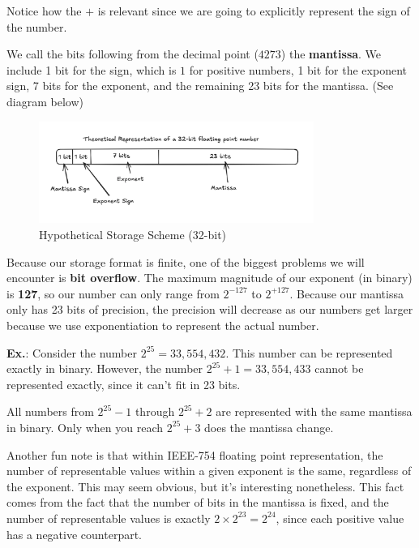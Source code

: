 \documentclass[12pt]{article}
\newcommand{\Ex}{\textbf{Ex.}\xspace}
\begin{document}
Notice how the $+$ is relevant since we are going to explicitly represent the
sign of the number.

We call the bits following from the decimal point ($4273$) the \textbf{mantissa}.
We include 1 bit for the sign, which is $1$ for positive numbers, 1 bit for the
exponent sign, 7 bits for the exponent, and the remaining 23 bits for the
mantissa. (See diagram below)

\begin{figure}[h]
  \centering
  \includegraphics[width=0.8\textwidth]{./fake_ieee754.png}
  \caption{Hypothetical Storage Scheme (32-bit)}
\end{figure}

Because our storage format is finite, one of the biggest problems we will 
encounter is \textbf{bit overflow}. The maximum magnitude of our exponent 
(in binary) is \textbf{127}, so our number can only range from $2^{-127}$ to
$2^{+127}$. Because our mantissa only has 23 bits of precision, the precision
will decrease as our numbers get larger because we use exponentiation to 
represent the actual number.

\Ex:
Consider the number $2^{25} = 33,554,432$. This number can be represented 
exactly in binary. However, the number $2^{25}+1 = 33,554,433$ cannot be
represented exactly, since it can't fit in 23 bits.

All numbers from $2^{25}-1$ through $2^{25}+2$ are represented with the same
mantissa in binary. Only when you reach $2^{25}+3$ does the mantissa change.

Another fun note is that within IEEE-754 floating point representation, the
number of representable values within a given exponent is the same, regardless
of the exponent. This may seem obvious, but it's interesting nonetheless. This
fact comes from the fact that the number of bits in the mantissa is fixed, and
the number of representable values is exactly $2\times 2^{23} = 2^{24}$, since each
positive value has a negative counterpart.
\end{document}
